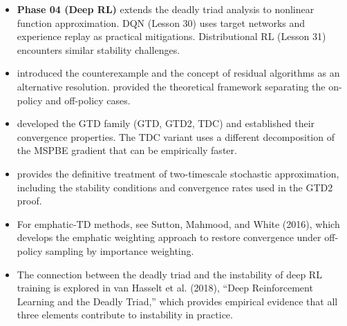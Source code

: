 \documentclass[11pt,a4paper]{article}
\begin{document}
\begin{itemize}
  \item \textbf{Phase 04 (Deep RL)} extends the deadly triad analysis
    to nonlinear function approximation. DQN (Lesson 30) uses target
    networks and experience replay as practical mitigations.
    Distributional RL (Lesson 31) encounters similar stability
    challenges.

  \item \citet{baird1995} introduced the counterexample and the
    concept of residual algorithms as an alternative resolution.
    \citet{tsitsiklis1997} provided the theoretical framework
    separating the on-policy and off-policy cases.

  \item \citet{sutton2009} developed the GTD family (GTD, GTD2, TDC)
    and established their convergence properties. The TDC variant
    uses a different decomposition of the MSPBE gradient that can
    be empirically faster.

  \item \citet{borkar2008} provides the definitive treatment of
    two-timescale stochastic approximation, including the stability
    conditions and convergence rates used in the GTD2 proof.

  \item For emphatic-TD methods, see Sutton, Mahmood, and White
    (2016), which develops the emphatic weighting approach to
    restore convergence under off-policy sampling by importance
    weighting.

  \item The connection between the deadly triad and the instability
    of deep RL training is explored in van Hasselt et al. (2018),
    ``Deep Reinforcement Learning and the Deadly Triad,'' which
    provides empirical evidence that all three elements contribute
    to instability in practice.
\end{itemize}


\end{document}
